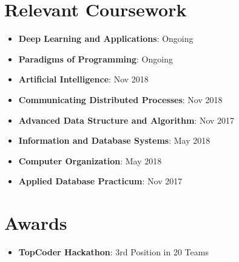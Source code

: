 \documentclass[letterpaper,11pt]{article}
\newcommand{\resumeItem}[2]{
  \item\small{
    \textbf{#1}{: #2 \vspace{-2pt}}
  }
}
\newcommand{\resumeSubItem}[2]{\resumeItem{#1}{#2}\vspace{-4pt}}
\newcommand{\resumeSubHeadingListStart}{\begin{itemize}[leftmargin=*]}
\newcommand{\resumeSubHeadingListEnd}{\end{itemize}}
\begin{document}
\section{Relevant Coursework}
  \resumeSubHeadingListStart
      \resumeSubItem
      {Deep Learning and Applications}{Ongoing}
      \resumeSubItem
      {Paradigms of Programming}{Ongoing}
      \resumeSubItem
      {Artificial Intelligence}{Nov 2018}
      \resumeSubItem
      {Communicating Distributed Processes}{Nov 2018}
      \resumeSubItem
      {Advanced Data Structure and Algorithm}{Nov 2017}
      \resumeSubItem
      {Information and Database Systems}{May 2018}
      \resumeSubItem
      {Computer Organization}{May 2018}
      \resumeSubItem
      {Applied Database Practicum}{Nov 2017}
    

  \resumeSubHeadingListEnd

\section{Awards}
  \resumeSubHeadingListStart

    \resumeSubItem
    {TopCoder Hackathon}{3rd Position in 20 Teams}

 \resumeSubHeadingListEnd

\end{document}
